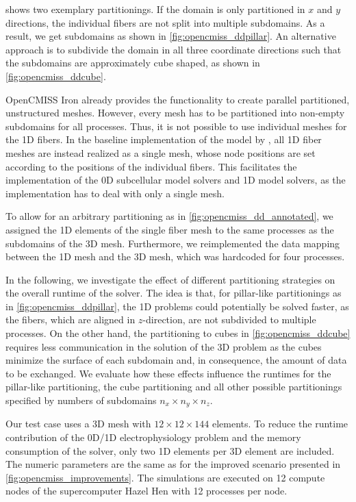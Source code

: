  shows two exemplary partitionings. If the domain is only partitioned in $x$ and $y$ directions, the individual fibers are not split into multiple subdomains. As a result, we get  subdomains as shown in \cref{fig:opencmiss_ddpillar}. An alternative approach is to subdivide the domain in all three coordinate directions such that the subdomains are approximately cube shaped, as shown in \cref{fig:opencmiss_ddcube}.

OpenCMISS Iron already provides the functionality to create parallel partitioned, unstructured meshes. However, every mesh has to be partitioned into non-empty subdomains for all processes. Thus, it is not possible to use individual meshes for the 1D fibers.
In the baseline implementation of the model by \cite{Heidlauf2013}, all 1D fiber meshes are instead realized as a single mesh, whose node positions are set according to the positions of the individual fibers. This facilitates the implementation of the 0D subcellular model solvers and 1D model solvers, as the implementation has to deal with only a single mesh. 

To allow for an arbitrary partitioning as in \cref{fig:opencmiss_dd_annotated}, we assigned the 1D elements of the single fiber mesh to the same processes as the subdomains of the 3D mesh. Furthermore, we reimplemented the data mapping between the 1D mesh and the 3D mesh, which was hardcoded for four processes.

In the following, we investigate the effect of different partitioning strategies on the overall runtime of the solver. The idea is that, for pillar-like partitionings as in \cref{fig:opencmiss_ddpillar}, the 1D problems could potentially be solved faster, as the fibers, which are aligned in $z$-direction, are not subdivided to multiple processes. On the other hand, the partitioning to cubes in \cref{fig:opencmiss_ddcube} requires less communication in the solution of the 3D problem as the cubes minimize the surface of each subdomain and, in consequence, the amount of data to be exchanged. We evaluate how these effects influence the runtimes for the pillar-like partitioning, the cube partitioning and all other possible partitionings specified by numbers of subdomains $n_x \times n_y \times n_z$.

Our test case uses a 3D mesh with $12 \times 12 \times 144$ elements. To reduce the runtime contribution of the 0D/1D electrophysiology problem and the memory consumption of the solver, only two 1D elements per 3D element are included. The numeric parameters are the same as for the improved scenario presented in \cref{fig:opencmiss_improvements}. The simulations are executed on 12 compute nodes of the supercomputer Hazel Hen with 12 processes per node.

